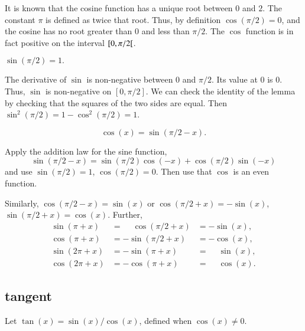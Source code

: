 It is known that the cosine function has a unique root between $0$
and $2$. The constant $\pi$ is defined as twice that root.  Thus, by
definition $\cos(\pi/2) = 0$, and the cosine has no root greater
than $0$ and less than $\pi/2$. The $\cos$ function is in fact
positive on the interval $[ 0,\pi/2[$.


\begin{lemma}\label{lemma:sin-pi2}
    $\sin (\pi/2) = 1.$
\end{lemma}

\begin{proved}
The derivative of $\sin$ is non-negative between $0$ and $\pi/2$.
Its value at $0$ is $0$.  Thus, $\sin$ is non-negative on
$[0,\pi/2]$.  We can check the identity of the lemma by checking
that the squares of the two sides are equal. Then $\sin^2(\pi/2) =
{1-\cos^2(\pi/2)} = 1$.
\swallowed\end{proved}

\begin{lemma}\label{lemma:cos-sin}
    $$\cos(x) = \sin(\pi/2 - x).$$
\end{lemma}

\begin{proved}
    Apply the addition law for the sine function,
    $$\sin(\pi/2 - x) = \sin(\pi/2)\cos(-x) + \cos(\pi/2)\sin(-x)$$
    and use
    $\sin(\pi/2) = 1$, $\cos(\pi/2) = 0$.  Then use that $\cos$ is
    an even function.
\swallowed\end{proved}

Similarly,%
%
$\cos(\pi/2 - x) = \sin(x)$ or $\cos(\pi/2 + x) =
-\sin(x)$, $\sin(\pi/2 + x) = \cos(x)$.  Further,
    $$\begin{array}{lll}
      \sin(\pi + x) &= \phantom{-}\cos(\pi/2 + x) &= -\sin(x),\\
      \cos(\pi + x) &= -\sin(\pi/2 + x) &= -\cos(x),\\
      \sin(2\pi + x) &= -\sin(\pi + x) &= \phantom{-}\sin(x),\\
      \cos(2\pi + x) &= -\cos(\pi + x) &= \phantom{-}\cos(x).
      \end{array}$$


\subsection{tangent}
\label{sec:tangent}

\begin{definition}[tangent]\label{def:tan}
Let $\tan(x) = \sin(x)/\cos(x)$, defined when $\cos(x)\ne0$.
\end{definition}


